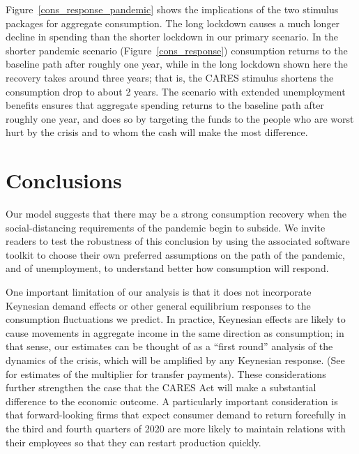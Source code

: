 \documentclass[titlepage,a4paper]{\econtex}
\begin{document}
Figure~\ref{cons_response_pandemic} shows the implications of the two stimulus packages for aggregate consumption.
The long lockdown causes a much longer decline in spending than the shorter lockdown in our primary scenario. In the shorter pandemic scenario (Figure~\ref{cons_response}) consumption returns to the baseline path after roughly one year, while in the long lockdown shown here the recovery takes around three years; that is,
the CARES stimulus shortens the consumption drop to about 2 years.
The scenario with extended unemployment benefits ensures that aggregate spending returns to the baseline path after roughly one year, and does so by targeting the funds to the people who are worst hurt by the crisis and to whom the cash will make the most difference.

\section{Conclusions}

Our model suggests that there may be a strong consumption recovery when the social-distancing requirements of the pandemic begin to subside.
We invite readers to test the robustness of this conclusion by using the associated software toolkit to choose their own preferred assumptions on the path of the pandemic, and of unemployment, to understand better how consumption will respond.

One important limitation of our analysis is that it does not incorporate Keynesian demand effects or other general equilibrium responses to the consumption fluctuations we predict.
In practice, Keynesian effects are likely to cause movements in aggregate income in the same direction as consumption; in that sense, our estimates can be thought of as a ``first round'' analysis of the dynamics of the crisis, which will be amplified by any Keynesian response.  (See \cite{bayer_corona} for estimates of the multiplier for transfer payments).
These considerations further strengthen the case that the CARES Act will make a substantial difference to the economic outcome.
A particularly important consideration is that forward-looking firms that expect consumer demand to return forcefully in the third and fourth quarters of 2020 are more likely to maintain relations with their employees so that they can restart production quickly.
\end{document}
